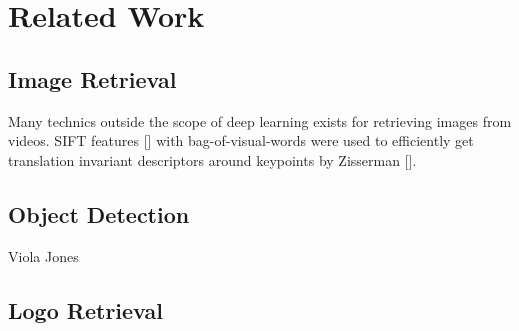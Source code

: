 \chapter{Related Work}

\section{Image Retrieval}

Many technics outside the scope of deep learning exists for retrieving images from videos. SIFT features [] with bag-of-visual-words were used to efficiently get translation invariant descriptors around keypoints by Zisserman []. 

\section{Object Detection}
Viola Jones

\section{Logo Retrieval}
